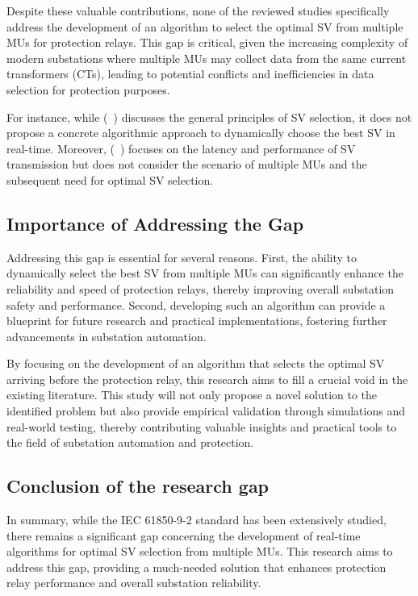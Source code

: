 Despite these valuable contributions, none of the reviewed studies specifically address the development of an algorithm to select the optimal SV from multiple MUs for protection relays. This gap is critical, given the increasing complexity of modern substations where multiple MUs may collect data from the same current transformers (CTs), leading to potential conflicts and inefficiencies in data selection for protection purposes.

For instance, while (~\cite{IEC61850_SEL_9_2}) discusses the general principles of SV selection, it does not propose a concrete algorithmic approach to dynamically choose the best SV in real-time. Moreover, (~\cite{galkin2024microcomputer}) focuses on the latency and performance of SV transmission but does not consider the scenario of multiple MUs and the subsequent need for optimal SV selection.

\subsection{Importance of Addressing the Gap}

Addressing this gap is essential for several reasons. First, the ability to dynamically select the best SV from multiple MUs can significantly enhance the reliability and speed of protection relays, thereby improving overall substation safety and performance. Second, developing such an algorithm can provide a blueprint for future research and practical implementations, fostering further advancements in substation automation.

By focusing on the development of an algorithm that selects the optimal SV arriving before the protection relay, this research aims to fill a crucial void in the existing literature. This study will not only propose a novel solution to the identified problem but also provide empirical validation through simulations and real-world testing, thereby contributing valuable insights and practical tools to the field of substation automation and protection.

\subsection{Conclusion of the research gap}

In summary, while the IEC 61850-9-2 standard has been extensively studied, there remains a significant gap concerning the development of real-time algorithms for optimal SV selection from multiple MUs. This research aims to address this gap, providing a much-needed solution that enhances protection relay performance and overall substation reliability.

